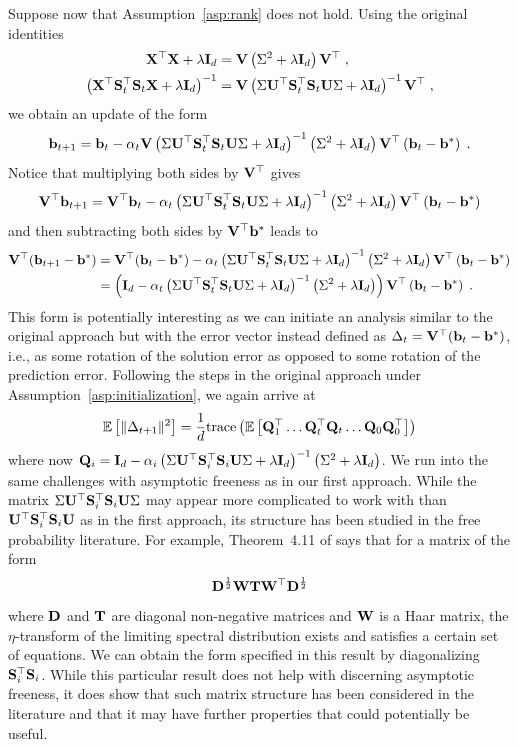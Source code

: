 Suppose now that Assumption~\ref{asp:rank} does not hold. Using the original identities
\begin{align*}
\mathbf{X}^\top\mathbf{X}+\lambda\mathbf{I}_d &= \mathbf{V}\left(\Sigma^2+ \lambda\mathbf{I}_d\right)\mathbf{V}^\top \;, \\
\left(\mathbf{X}^\top\mathbf{S}_t^\top\mathbf{S}_t\mathbf{X} + \lambda\mathbf{I}_d\right)^{-1} &= \mathbf{V}\left(\Sigma\mathbf{U}^\top\mathbf{S}_t^\top\mathbf{S}_t\mathbf{U}\Sigma + \lambda\mathbf{I}_d\right)^{-1}\mathbf{V}^\top \;,
\end{align*}
we obtain an update of the form
\[
\mathbf{b}_{t+1} = \mathbf{b}_t - \alpha_t\mathbf{V}\left(\Sigma\mathbf{U}^\top\mathbf{S}_t^\top\mathbf{S}_t\mathbf{U}\Sigma + \lambda\mathbf{I}_d\right)^{-1}\left(\Sigma^2 + \lambda\mathbf{I}_d \right)\mathbf{V}^\top\left(\mathbf{b}_t-\mathbf{b}^*\right) \;.
\]
Notice that multiplying both sides by $\mathbf{V}^\top$ gives
\[
\mathbf{V}^\top\mathbf{b}_{t+1} = \mathbf{V}^\top\mathbf{b}_t - \alpha_t\left(\Sigma\mathbf{U}^\top\mathbf{S}_t^\top\mathbf{S}_t\mathbf{U}\Sigma + \lambda\mathbf{I}_d\right)^{-1}\left(\Sigma^2 + \lambda\mathbf{I}_d \right)\mathbf{V}^\top\left(\mathbf{b}_t-\mathbf{b}^*\right)
\]
and then subtracting both sides by $\mathbf{V}^\top\mathbf{b}^*$ leads to
\begin{align*}
\mathbf{V}^\top(\mathbf{b}_{t+1}-\mathbf{b}^*) &= \mathbf{V}^\top(\mathbf{b}_t-\mathbf{b}^*) - \alpha_t\left(\Sigma\mathbf{U}^\top\mathbf{S}_t^\top\mathbf{S}_t\mathbf{U}\Sigma + \lambda\mathbf{I}_d\right)^{-1}\left(\Sigma^2 + \lambda\mathbf{I}_d \right)\mathbf{V}^\top\left(\mathbf{b}_t-\mathbf{b}^*\right) \\
&= \left(\mathbf{I}_d - \alpha_t\left(\Sigma\mathbf{U}^\top\mathbf{S}_t^\top\mathbf{S}_t\mathbf{U}\Sigma + \lambda\mathbf{I}_d\right)^{-1}\left(\Sigma^2 + \lambda\mathbf{I}_d \right)\right)\mathbf{V}^\top\left(\mathbf{b}_t-\mathbf{b}^*\right) \;.
\end{align*}
This form is potentially interesting as we can initiate an analysis similar to the original approach but with the error vector instead defined as $\Delta_t=\mathbf{V}^\top(\mathbf{b}_t-\mathbf{b}^*)$, i.e., as some rotation of the solution error as opposed to some rotation of the prediction error. Following the steps in the original approach under Assumption~\ref{asp:initialization}, we again arrive at
\[
\mathbb{E}\left[\|\Delta_{t+1}\|^2\right] = \frac{1}{d}\mathrm{trace}\left(\mathbb{E}\left[\mathbf{Q}_1^\top\ldots \mathbf{Q}_t^\top\mathbf{Q}_t\ldots\mathbf{Q}_0\mathbf{Q}_0^\top\right]\right)
\]
where now $\mathbf{Q}_i = \mathbf{I}_d-\alpha_i\left(\Sigma\mathbf{U}^\top\mathbf{S}_i^\top\mathbf{S}_i\mathbf{U}\Sigma + \lambda\mathbf{I}_d\right)^{-1}\left(\Sigma^2 + \lambda\mathbf{I}_d \right)$. We run into the same challenges with asymptotic freeness as in our first approach. While the matrix $\Sigma\mathbf{U}^\top\mathbf{S}_i^\top\mathbf{S}_i\mathbf{U}\Sigma$ may appear more complicated to work with than $\mathbf{U}^\top\mathbf{S}_i^\top\mathbf{S}_i\mathbf{U}$ as in the first approach, its structure has been studied in the free probability literature. For example, Theorem~4.11 of \citep{Couillet:2011_free} says that for a matrix of the form
\[
\mathbf{D}^\frac{1}{2}\mathbf{W}\mathbf{T}\mathbf{W}^\top\mathbf{D}^\frac{1}{2}
\]
where $\mathbf{D}$ and $\mathbf{T}$ are diagonal non-negative matrices and $\mathbf{W}$ is a Haar matrix, the $\eta$-transform of the limiting spectral distribution exists and satisfies a certain set of equations. We can obtain the form specified in this result by diagonalizing $\mathbf{S}_i^\top\mathbf{S}_i$. While this particular result does not help with discerning asymptotic freeness, it does show that such matrix structure has been considered in the literature and that it may have further properties that could potentially be useful.


